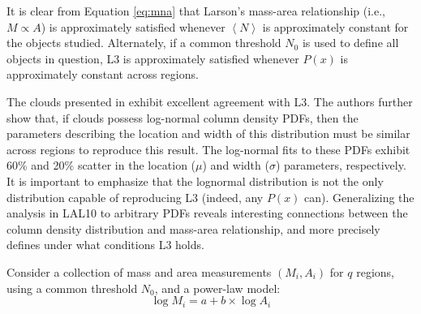 It is clear from Equation \ref{eq:mna} that Larson's mass-area relationship (i.e., $M \propto A$) is approximately satisfied whenever $\left<N\right>$ is approximately constant for the objects studied. Alternately, if a common threshold $N_0$ is used to define all objects in question, L3 is approximately satisfied whenever $P(x)$ is approximately constant across regions.

The clouds presented in \cite{Lombardi10} exhibit excellent agreement with L3. The authors further show that, if clouds possess log-normal column density PDFs, then the parameters describing the location and width of this distribution must be similar across regions to reproduce this result. The log-normal fits to these PDFs exhibit 60\% and 20\% scatter in the location ($\mu$) and width ($\sigma$) parameters, respectively. It is important to emphasize that the lognormal distribution is not the only distribution capable of reproducing L3 (indeed, any $P(x)$ can). Generalizing the analysis in LAL10 to arbitrary PDFs reveals interesting connections between the column density distribution and mass-area relationship, and more precisely defines under what conditions L3 holds.

Consider a collection of mass and area measurements $(M_i, A_i)$ for $q$ regions, using a common threshold $N_0$, and a power-law model:
\begin{equation}
\log M_i = a + b \times \log A_i
\label{eq:model}
\end{equation}

